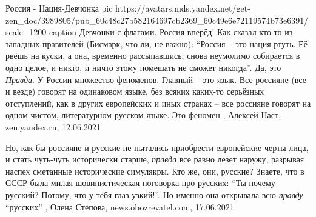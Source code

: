 Россия - Нация-Девчонка
\ifcmt
	pic https://avatars.mds.yandex.net/get-zen_doc/3989805/pub_60c48c27b582164697cb2369_60c49e6e72119574b73e6391/scale_1200
  caption Девчонки с флагами. Россия вперёд!
\fi
Как сказал кто-то из западных правителей (Бисмарк, что ли, не важно):
\enquote{Россия -- это нация ртуть. Её рвёшь на куски, а она, временно
рассыпавшись, снова неумолимо собирается в одно целое, и никто, и ничто этому
помешать не сможет никогда}. Да, это \emph{Правда}. У России множество
феноменов. Главный -- это язык.  Все россияне (все и везде) говорят на
одинаковом языке, без всяких каких-то серьёзных отступлений, как в других
европейских и иных странах -- все россияне говорят на одном чистом,
литературном русском языке. Это феномен
, 
Алексей Наст, zen.yandex.ru, 12.06.2021

Но, как бы россияне и русские не пытались приобрести европейские черты лица, и
стать чуть-чуть исторически старше, \emph{правда} все равно лезет наружу, разрывая
наспех сметанные исторические симулякры.  Кто же, они, русские?  Знаете, что в
СССР была милая шовинистическая поговорка про русских: \enquote{Ты почему русский?
Потому, что у тебя глаз узкий!}. Но именно она открывала всю \emph{правду} \enquote{русских}
, 
Олена Степова, news.obozrevatel.com, 17.06.2021

